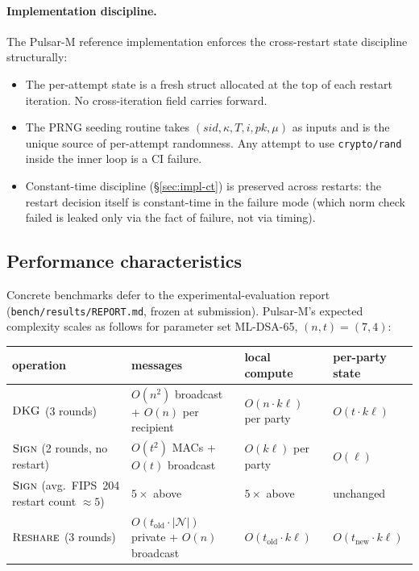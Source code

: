 \documentclass[11pt,a4paper]{article}
\theoremstyle{definition}
\theoremstyle{remark}
\newcommand{\Sign}{\textsc{Sign}}
\newcommand{\DKG}{\textsc{DKG}}
\newcommand{\Reshare}{\textsc{Reshare}}
\begin{document}
\paragraph{Implementation discipline.}
The Pulsar-M reference implementation enforces the cross-restart
state discipline structurally:

\begin{itemize}[leftmargin=*, itemsep=0pt]
\item The per-attempt state is a fresh struct allocated at the top
of each restart iteration. No cross-iteration field carries forward.
\item The PRNG seeding routine takes
$(\mathit{sid}, \kappa, T, i, \mathit{pk}, \mu)$ as inputs and is
the unique source of per-attempt randomness. Any attempt to use
\texttt{crypto/rand} inside the inner loop is a CI failure.
\item Constant-time discipline (\S\ref{sec:impl-ct}) is preserved
across restarts: the restart decision itself is constant-time in
the failure mode (which norm check failed is leaked only via the
fact of failure, not via timing).
\end{itemize}

\subsection{Performance characteristics}
\label{sec:impl-perf}

Concrete benchmarks defer to the experimental-evaluation report
(\texttt{bench/results/REPORT.md}, frozen at submission). Pulsar-M's
expected complexity scales as follows for parameter set ML-DSA-65,
$(n, t) = (7, 4)$:

\begin{center}
\begin{tabular}{l l l l}
\toprule
operation & messages & local compute & per-party state \\
\midrule
$\DKG$ (3 rounds)
& $O(n^2)$ broadcast + $O(n)$ per recipient
& $O(n \cdot k \ell)$ per party
& $O(t \cdot k \ell)$ \\
$\Sign$ (2 rounds, no restart)
& $O(t^2)$ MACs + $O(t)$ broadcast
& $O(k \ell)$ per party
& $O(\ell)$ \\
$\Sign$ (avg.\ FIPS~204 restart count $\approx 5$)
& $5 \times$ above
& $5 \times$ above
& unchanged \\
$\Reshare$ (3 rounds)
& $O(t_{\mathrm{old}} \cdot |\mathcal{N}|)$ private + $O(n)$ broadcast
& $O(t_{\mathrm{old}} \cdot k \ell)$
& $O(t_{\mathrm{new}} \cdot k \ell)$ \\
\bottomrule
\end{tabular}
\end{center}
\end{document}
